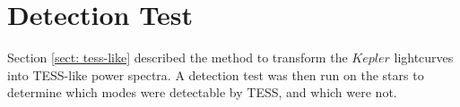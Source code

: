 \documentclass[a4paper,fleqn,usenatbib,useAMS]{mnras}
\newcommand{\kep}{\ensuremath{Kepler}\:}
\begin{document}

\section{Detection Test}
\label{sect: det_test}

Section \ref{sect: tess-like} described the method to transform the $Kepler$ lightcurves into TESS-like power spectra. A detection test was then run on the stars to determine which modes were detectable by TESS, and which were not.
\end{document}
